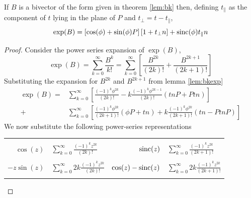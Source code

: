 \begin{thm}
\label{lem:exp}
If $B$ is a bivector of the form given in theorem \ref{lem:bk}
then, defining 
$t_\parallel$ as the component of $t$ lying in the plane of $P$ 
and $t_\perp = t - t_\parallel$,
\[
\exp(B) = \left[ \cos(\phi) + \sin(\phi) P \right] \left[ 1 + t_\perp n \right] + \mathrm{sinc}(\phi) t_\parallel n
\]
\end{thm}
\begin{proof}
Consider the power series expansion of $\exp (B)$,
\[
\exp (B)=\sum _{k=0}^{\infty }\frac{B^{k}}{k!}=\sum _{k=0}^{\infty }\left[\frac{B^{2k}}{(2k)!}+\frac{B^{2k+1}}{(2k+1)!}\right]\]
Substituting the expansion for $B^{2k}$ and $B^{2k+1}$ from 
lemma \ref{lem:bkexp}
\begin{align*}
\exp (B)= & \sum _{k=0}^{\infty }\left[
 \frac{
   (-1)^k\phi^{2k}
 }{(2k)!} - k \frac{
   (-1)^k\phi^{2k-1}
 }{(2k)!} \left(tnP + Ptn\right)
\right]\\
+ & \sum _{k=0}^{\infty }\left[
 \frac{
   (-1)^k\phi^{2k}
 }{(2k+1)!} \left(\phi P + tn\right) + 
 k\frac{
   (-1)^k \phi^{2k}
 }{(2k+1)!} \left( tn - PtnP \right)\right]
\end{align*}
We now substitute the following power-series representations

\begin{centering}


\begin{tabular}{r@{$\ =\ $}l@{$\quad$}r@{$\ = \ $}l}
\multicolumn{4}{l}{\vspace{0.1cm}} \\
$\cos(z)$ & $\sum_{k=0}^\infty \frac{(-1)^k z^{2k}}{(2k)!}$ &
$\mathrm{sinc}(z)$ & $\sum_{k=0}^\infty \frac{(-1)^k z^{2k}}{(2k+1)!}$ \\
\multicolumn{4}{l}{\vspace{0.1cm}} \\
$- z \sin(z)$ & $\sum_{k=0}^\infty 2k \frac{(-1)^k z^{2k}}{(2k)!}$ &
$\cos(z) - \mathrm{sinc}(z)$ & $\sum_{k=0}^\infty 2k \frac{(-1)^k z^{2k}}{(2k+1)!}$ \\
\multicolumn{4}{l}{\vspace{0.1cm}} \\
\end{tabular}


\end{centering}
\end{proof}
